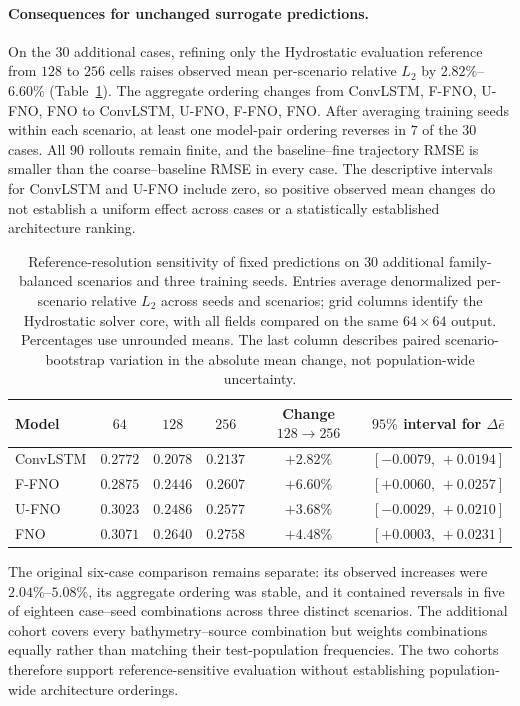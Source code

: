 \FloatBarrier
\paragraph{Consequences for unchanged surrogate predictions.}
On the $30$ additional cases, refining only the Hydrostatic evaluation reference from $128$ to $256$ cells raises observed mean per-scenario relative $L_2$ by $2.82\%$--$6.60\%$ (Table~\ref{tab:fixed-prediction-resolution}). The aggregate ordering changes from ConvLSTM, F-FNO, U-FNO, FNO to ConvLSTM, U-FNO, F-FNO, FNO. After averaging training seeds within each scenario, at least one model-pair ordering reverses in $7$ of the $30$ cases. All $90$ rollouts remain finite, and the baseline--fine trajectory RMSE is smaller than the coarse--baseline RMSE in every case. The descriptive intervals for ConvLSTM and U-FNO include zero, so positive observed mean changes do not establish a uniform effect across cases or a statistically established architecture ranking.

\begin{table}[pos=!htbp]
\centering
\caption{Reference-resolution sensitivity of fixed predictions on $30$ additional family-balanced scenarios and three training seeds. Entries average denormalized per-scenario relative $L_2$ across seeds and scenarios; grid columns identify the Hydrostatic solver core, with all fields compared on the same $64\times64$ output. Percentages use unrounded means. The last column describes paired scenario-bootstrap variation in the absolute mean change, not population-wide uncertainty.}
\label{tab:fixed-prediction-resolution}
\small
\begin{tabular}{lccccc}
\toprule
Model & $64$ & $128$ & $256$ & Change $128\rightarrow256$ & $95\%$ interval for $\Delta\bar e$ \\
\midrule
ConvLSTM & $0.2772$ & $0.2078$ & $0.2137$ & $+2.82\%$ & $[-0.0079,\,+0.0194]$ \\
F-FNO & $0.2875$ & $0.2446$ & $0.2607$ & $+6.60\%$ & $[+0.0060,\,+0.0257]$ \\
U-FNO & $0.3023$ & $0.2486$ & $0.2577$ & $+3.68\%$ & $[-0.0029,\,+0.0210]$ \\
FNO & $0.3071$ & $0.2640$ & $0.2758$ & $+4.48\%$ & $[+0.0003,\,+0.0231]$ \\
\bottomrule
\end{tabular}
\end{table}

The original six-case comparison remains separate: its observed increases were $2.04\%$--$5.08\%$, its aggregate ordering was stable, and it contained reversals in five of eighteen case--seed combinations across three distinct scenarios. The additional cohort covers every bathymetry--source combination but weights combinations equally rather than matching their test-population frequencies. The two cohorts therefore support reference-sensitive evaluation without establishing population-wide architecture orderings.

